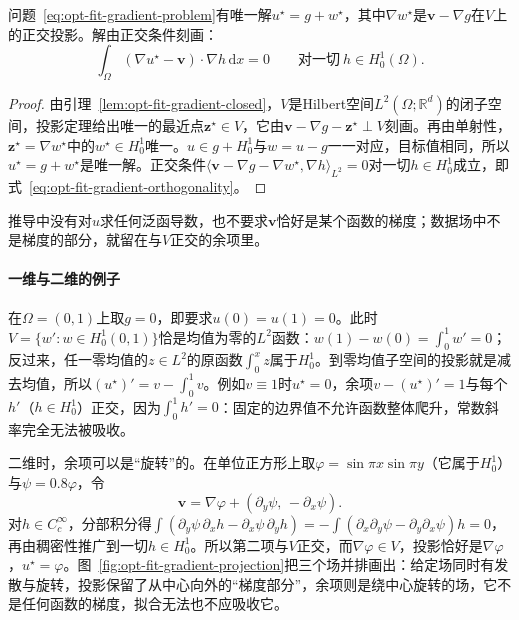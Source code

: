 \begin{theorem}[梯度场拟合]
\label{thm:opt-fit-gradient}
问题~\eqref{eq:opt-fit-gradient-problem}有唯一解$u^\star=g+w^\star$，其中$\nabla w^\star$是$\bm v-\nabla g$在$V$上的正交投影。解由正交条件刻画：
\begin{equation}
  \int_\Omega(\nabla u^\star-\bm v)\cdot\nabla h\,\mathrm dx=0\qquad\text{对一切}\ h\in H_0^1(\Omega).
  \label{eq:opt-fit-gradient-orthogonality}
\end{equation}
\end{theorem}

\begin{proof}
由引理~\ref{lem:opt-fit-gradient-closed}，$V$是Hilbert空间$L^2(\Omega;\mathbb R^d)$的闭子空间，投影定理给出唯一的最近点$\bm z^\star\in V$，它由$\bm v-\nabla g-\bm z^\star\perp V$刻画。再由单射性，$\bm z^\star=\nabla w^\star$中的$w^\star\in H_0^1$唯一。$u\in g+H_0^1$与$w=u-g$一一对应，目标值相同，所以$u^\star=g+w^\star$是唯一解。正交条件$\langle\bm v-\nabla g-\nabla w^\star,\nabla h\rangle_{L^2}=0$对一切$h\in H_0^1$成立，即式~\eqref{eq:opt-fit-gradient-orthogonality}。
\end{proof}

推导中没有对$u$求任何泛函导数，也不要求$\bm v$恰好是某个函数的梯度；数据场中不是梯度的部分，就留在与$V$正交的余项里。

\paragraph{一维与二维的例子}
在$\Omega=(0,1)$上取$g=0$，即要求$u(0)=u(1)=0$。此时$V=\{w':w\in H_0^1(0,1)\}$恰是均值为零的$L^2$函数：$w(1)-w(0)=\int_0^1w'=0$；反过来，任一零均值的$z\in L^2$的原函数$\int_0^xz$属于$H_0^1$。到零均值子空间的投影就是减去均值，所以$(u^\star)'=v-\int_0^1v$。例如$v\equiv1$时$u^\star=0$，余项$v-(u^\star)'=1$与每个$h'$（$h\in H_0^1$）正交，因为$\int_0^1h'=0$：固定的边界值不允许函数整体爬升，常数斜率完全无法被吸收。

二维时，余项可以是“旋转”的。在单位正方形上取$\varphi=\sin\pi x\sin\pi y$（它属于$H_0^1$）与$\psi=0.8\varphi$，令
\[
  \bm v=\nabla\varphi+(\partial_y\psi,\,-\partial_x\psi).
\]
对$h\in C_c^\infty$，分部积分得$\int(\partial_y\psi\,\partial_xh-\partial_x\psi\,\partial_yh)=-\int(\partial_x\partial_y\psi-\partial_y\partial_x\psi)h=0$，再由稠密性推广到一切$h\in H_0^1$。所以第二项与$V$正交，而$\nabla\varphi\in V$，投影恰好是$\nabla\varphi$，$u^\star=\varphi$。图~\ref{fig:opt-fit-gradient-projection}把三个场并排画出：给定场同时有发散与旋转，投影保留了从中心向外的“梯度部分”，余项则是绕中心旋转的场，它不是任何函数的梯度，拟合无法也不应吸收它。

